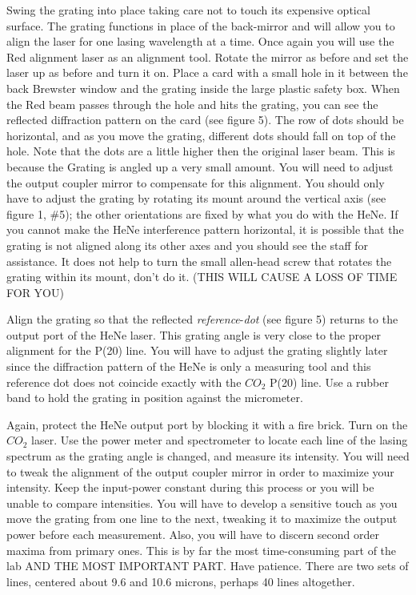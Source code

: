 \documentclass{../lab}
\begin{document}
Swing the grating into place taking care not to touch its expensive optical surface. The grating functions in place of the back-mirror and will allow you to align the laser for one lasing wavelength at a time. Once again you will use the Red alignment laser as an alignment tool. Rotate the mirror as before and set the laser up as before and turn it on. Place a card with a small hole in it between the back Brewster window and the grating inside the large plastic safety box. When the Red beam passes through the hole and hits the grating, you can see the reflected diffraction pattern on the card (see figure 5). The row of dots should be horizontal, and as you move the grating, different dots should fall on top of the hole. Note that the dots are a little higher then the original laser beam. This is because the Grating is angled up a very small amount. You will need to adjust the output coupler mirror to compensate for this alignment. You should only have to adjust the grating by rotating its mount around the vertical axis (see figure 1, \#5); the other orientations are fixed by what you do with the HeNe. If you cannot make the HeNe interference pattern horizontal, it is possible that the grating is not aligned along its other axes and you should see the staff for assistance. It does not help to turn the small allen-head screw that rotates the grating within its mount, don't do it. (THIS WILL CAUSE A LOSS OF TIME FOR YOU)

Align the grating so that the reflected \emph{reference}-\emph{dot} (see figure 5) returns to the output port of the HeNe laser. This grating angle is very close to the proper alignment for the P(20) line. You will have to adjust the grating slightly later since the diffraction pattern of the HeNe is only a measuring tool and this reference dot does not coincide exactly with the $CO_2 $ P(20) line. Use a rubber band to hold the grating in position against the micrometer.

Again, protect the HeNe output port by blocking it with a fire brick. Turn on the $CO_2 $ laser. Use the power meter and spectrometer to locate each line of the lasing spectrum as the grating angle is changed, and measure its intensity. You will need to tweak the alignment of the output coupler mirror in order to maximize your intensity. Keep the input-power constant during this process or you will be unable to compare intensities. You will have to develop a sensitive touch as you move the grating from one line to the next, tweaking it to maximize the output power before each measurement. Also, you will have to discern second order maxima from primary ones. This is by far the most time-consuming part of the lab AND THE MOST IMPORTANT PART. Have patience. There are two sets of lines, centered about 9.6 and 10.6 microns, perhaps 40 lines altogether.
\end{document}

